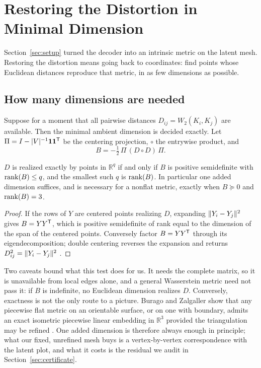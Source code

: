 \section{Restoring the Distortion in Minimal Dimension}
\label{sec:restore}

Section~\ref{sec:setup} turned the decoder into an intrinsic metric on the
latent mesh.  Restoring the distortion means going back to coordinates: find
points whose Euclidean distances reproduce that metric, in as few dimensions
as possible.

\subsection{How many dimensions are needed}
\label{sec:dimension}

Suppose for a moment that all pairwise distances $D_{ij}=W_2(K_i,K_j)$ are
available.  Then the minimal ambient dimension is decided exactly.  Let
$\Pi=I-|V|^{-1}\mathbf1\mathbf1^{\mathsf{T}}$ be the centering projection,
$\circ$ the entrywise product, and
\begin{equation}
 B=-\tfrac12\,\Pi\,(D\circ D)\,\Pi.
 \label{eq:centered-distance-gram}
\end{equation}

\begin{proposition}
\label{prop:dimension-test}
$D$ is realized exactly by points in $\mathbb R^q$ if and only if $B$ is
positive semidefinite with $\operatorname{rank}(B)\le q$, and the smallest such $q$ is
$\operatorname{rank}(B)$.  In particular one added dimension suffices, and is necessary for
a nonflat metric, exactly when $B\succeq0$ and $\operatorname{rank}(B)=3$.
\end{proposition}

\begin{proof}
If the rows of $Y$ are centered points realizing $D$, expanding
$\lVert Y_i-Y_j\rVert^2$ gives $B=YY^{\mathsf{T}}$, which is positive semidefinite of
rank equal to the dimension of the span of the centered points.  Conversely
factor $B=YY^{\mathsf{T}}$ through its eigendecomposition; double centering
reverses the expansion and returns $D_{ij}^2=\lVert Y_i-Y_j\rVert^2$
\cite{liberti2014}.
\end{proof}

Two caveats bound what this test does for us.  It needs the complete matrix,
so it is unavailable from local edges alone, and a general Wasserstein metric
need not pass it: if $B$ is indefinite, no Euclidean dimension realizes $D$.
Conversely, exactness is not the only route to a picture.  Burago and
Zalgaller show that any piecewise flat metric on an orientable surface, or on
one with boundary, admits an exact isometric piecewise linear embedding in
$\mathbb R^3$ provided the triangulation may be refined \cite{burago1995}.
One added dimension is therefore always enough in principle; what our fixed,
unrefined mesh buys is a vertex-by-vertex correspondence with the latent plot,
and what it costs is the residual we audit in
Section~\ref{sec:certificate}.

